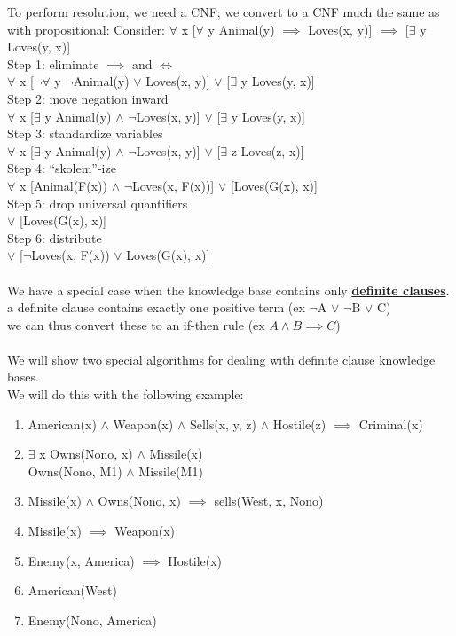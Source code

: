 \documentclass[../../lecture_notes.tex]{subfiles}
\begin{document}
\noindent To perform resolution, we need a CNF; we convert to a CNF much the same as with propositional:
Consider: $\forall$ x [$\forall$ y Animal(y) $\implies$ Loves(x, y)] $\implies$ [$\exists$ y Loves(y, x)]\\
	\indent Step 1: eliminate $\implies$ and $\iff$\\
	\indent\indent $\forall$ x [$\neg$$\forall$ y $\neg$Animal(y) $\lor$ Loves(x, y)] $\lor$ [$\exists$ y Loves(y, x)]\\
	\indent Step 2: move negation inward\\
	\indent \indent $\forall$ x [$\exists$ y Animal(y) $\land$ $\neg$Loves(x, y)] $\lor$ [$\exists$ y Loves(y, x)]\\
	\indent Step 3: standardize variables\\
        \indent \indent $\forall$ x [$\exists$ y Animal(y) $\land$ $\neg$Loves(x, y)] $\lor$ [$\exists$ z Loves(z, x)]\\
	\indent Step 4: “skolem”-ize\\
        \indent \indent $\forall$ x [Animal(F(x)) $\land$ $\neg$Loves(x, F(x))] $\lor$ [Loves(G(x), x)]\\
	\indent Step 5: drop universal quantifiers\\
        \indent {} $\lor$ [Loves(G(x), x)]\\
	\indent Step 6: distribute\\
        \indent {} $\lor$ [$\neg$Loves(x, F(x)) $\lor$ Loves(G(x), x)]\\
\\
We have a special case when the knowledge base contains only \textbf{\underline{definite clauses}}.\\
\indent a definite clause contains exactly one positive term (ex $\neg$A $\lor$ $\neg$B $\lor$ C)\\
\indent we can thus convert these to an if-then rule (ex $A \land B \implies C$)\\
\\
We will show two special algorithms for dealing with definite clause knowledge bases.\\
We will do this with the following example:
	\begin{enumerate} [itemsep=0mm]
		\item American(x) $\land$ Weapon(x) $\land$ Sells(x, y, z) $\land$ Hostile(z) $\implies$ Criminal(x)
		\item $\exists$ x Owns(Nono, x) $\land$ Missile(x) \\
			Owns(Nono, M1) $\land$ Missile(M1)
		\item Missile(x) $\land$ Owns(Nono, x) $\implies$ sells(West, x, Nono)
		\item Missile(x) $\implies$ Weapon(x)
		\item Enemy(x, America) $\implies$ Hostile(x)
		\item American(West)
		\item Enemy(Nono, America)
	\end{enumerate}
\end{document}
